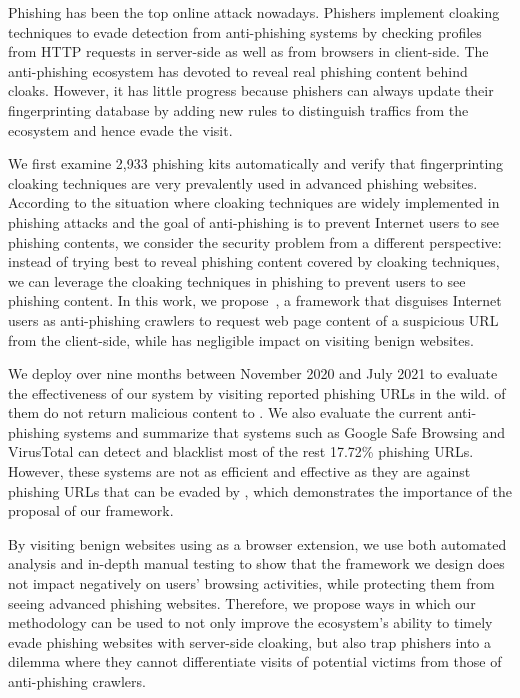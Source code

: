 Phishing has been the top online attack nowadays.
Phishers implement cloaking techniques to evade detection from anti-phishing systems by checking profiles from HTTP requests in server-side as well as from browsers in client-side.
The anti-phishing ecosystem has devoted to reveal real phishing content behind cloaks.
However, it has little progress because phishers can always update their fingerprinting database by adding new rules to distinguish traffics from the ecosystem and hence evade the visit.

We first examine 2,933 phishing kits automatically and verify that fingerprinting cloaking techniques are very prevalently used in advanced phishing websites.
According to the situation where cloaking techniques are widely implemented in phishing attacks and the goal of anti-phishing is to prevent Internet users to see phishing contents, we consider the security problem from a different perspective:
instead of trying best to reveal phishing content covered by cloaking techniques, we can leverage the cloaking techniques in phishing to prevent users to see phishing content.
In this work, we propose~\spartacus, a framework that disguises Internet users as anti-phishing crawlers to request web page content of a suspicious URL from the client-side, while has negligible impact on visiting benign websites.



We deploy \spartacus over nine months between November 2020 and July 2021 to evaluate the effectiveness of our system by visiting \totalphishing reported phishing URLs in the wild.
\evadedphishing of them do not return malicious content to \spartacus.
We also evaluate the current anti-phishing systems and summarize that systems such as Google Safe Browsing and VirusTotal can detect and blacklist most of the rest 17.72\% phishing URLs.
However, these systems are not as efficient and effective as they are against phishing URLs that can be evaded by \spartacus,
which demonstrates the importance of the proposal of our framework.

By visiting benign websites using \spartacus as a browser extension, we use both automated analysis and in-depth manual testing to show that the framework we design does not impact negatively on users' browsing activities, while protecting them from seeing advanced phishing websites.
Therefore, we propose ways in which our methodology can be used to not only improve the ecosystem’s ability to timely evade phishing websites with server-side cloaking, but also trap phishers into a dilemma where they cannot differentiate visits of potential victims from those of anti-phishing crawlers.
